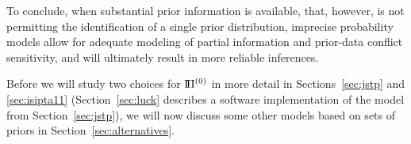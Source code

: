 To conclude, when substantial prior information is available, that, however,
is not permitting the identification of a single prior distribution,
imprecise probability models allow for adequate modeling of partial information and prior-data conflict sensitivity,
and will ultimately result in more reliable inferences.

\medskip

Before we will study two choices for $\text{I}\!\Pi^{(0)}$ %
in more detail in Sections~\ref{sec:jstp} and \ref{sec:isipta11}
(Section~\ref{sec:luck} describes a software implementation of the model from Section~\ref{sec:jstp}),
we will now discuss some other models based on sets of priors in Section~\ref{sec:alternatives}.







